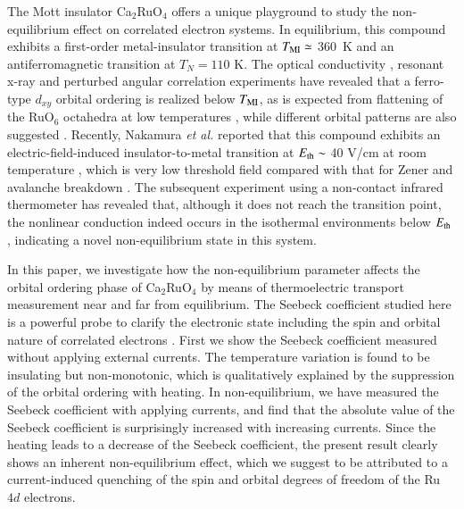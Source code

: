 \documentclass[aps,twocolumn,showpacs,preprintnumbers,amsmath,amssymb,floats,citeautoscript,nobalancelastpage]{revtex4-1}
\begin{document}
The Mott insulator Ca$_{2}$RuO$_4$ \cite{Nakatsuji1997,Cao1997} 
offers a unique playground to study the non-equilibrium effect
on correlated electron systems.
In equilibrium, this compound exhibits 
a first-order metal-insulator transition
at $T_{\rm MI} \simeq$ 360~K \cite{Alexander1999}
and an antiferromagnetic transition at 
$T_N = 110$ K.
The optical conductivity \cite{Jung2003},
resonant x-ray \cite{Kubota2005} and
perturbed angular correlation \cite{Rams2009}
experiments have revealed that 
a ferro-type $d_{xy}$ orbital ordering is realized
below $T_{\rm MI}$, 
as is expected from flattening of the RuO$_6$ octahedra at low temperatures \cite{Braden1998,Fridet2001,Anisimov2002,Gorelov2010,Sutter2017}, 
while different orbital patterns are also suggested \cite{Mizokawa2001,Hotta2001,Lee2002}.
Recently, Nakamura {\it et al.} reported that this compound exhibits 
an electric-field-induced insulator-to-metal transition at
$E_{\rm th} \sim$ 40 V/cm at room temperature \cite{Nakamura2013},
which is very low threshold field compared with that for Zener and avalanche breakdown \cite{Conwellreview}.
The subsequent experiment using a non-contact infrared thermometer has revealed that,
although it does not reach the transition point,
the nonlinear conduction indeed occurs in the isothermal environments below $E_{\rm th}$ \cite{Okazaki2013},
indicating a novel non-equilibrium state in this system.

In this paper, 
we investigate how the non-equilibrium parameter affects 
the orbital ordering phase of Ca$_2$RuO$_4$
by means of thermoelectric transport measurement near and far from equilibrium.
The Seebeck coefficient studied here is a powerful probe to clarify
the electronic state \cite{Mahan1998,Behnia2004}
including the spin and orbital nature of correlated electrons \cite{Koshibae2000,Koshibae2001}. 
First we show the Seebeck coefficient measured without applying 
external currents. 
The temperature variation is found to be insulating but non-monotonic, 
which is qualitatively explained by the suppression of the orbital ordering with heating.
In non-equilibrium, we have measured the Seebeck coefficient with applying currents,
and find that the absolute value of the Seebeck coefficient is surprisingly increased with increasing currents.
Since the heating leads to a decrease of the Seebeck coefficient,
the present result clearly shows an inherent  non-equilibrium effect,
which we suggest to be attributed to a current-induced quenching 
of the spin and orbital degrees of freedom of the Ru $4d$ electrons.
\end{document}
